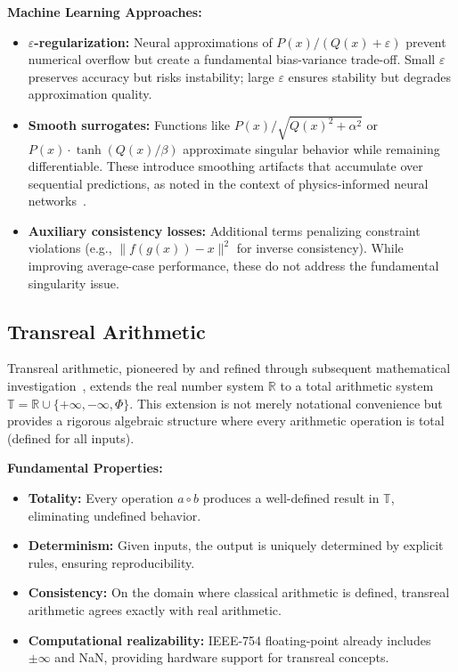 \documentclass[twoside,11pt]{article}
\newcommand{\TR}{\mathbb{T}}
\newcommand{\RR}{\mathbb{R}}
\begin{document}
\textbf{Machine Learning Approaches:}
\begin{itemize}
\item \textbf{$\varepsilon$-regularization:} Neural approximations of $P(x)/(Q(x)+\varepsilon)$ prevent numerical overflow but create a fundamental bias-variance trade-off. Small $\varepsilon$ preserves accuracy but risks instability; large $\varepsilon$ ensures stability but degrades approximation quality.
\item \textbf{Smooth surrogates:} Functions like $P(x)/\sqrt{Q(x)^2 + \alpha^2}$ or $P(x)\cdot\tanh(Q(x)/\beta)$ approximate singular behavior while remaining differentiable. These introduce smoothing artifacts that accumulate over sequential predictions, as noted in the context of physics-informed neural networks~\citep{wang2021understanding}.
\item \textbf{Auxiliary consistency losses:} Additional terms penalizing constraint violations (e.g., $\|f(g(x)) - x\|^2$ for inverse consistency). While improving average-case performance, these do not address the fundamental singularity issue.
\end{itemize}
\subsection{Transreal Arithmetic}
Transreal arithmetic, pioneered by \citet{anderson2006perspex} and refined through subsequent mathematical investigation~\citep{reis2016transreal,reis2016transfields}, extends the real number system $\RR$ to a total arithmetic system $\TR = \RR \cup \{+\infty, -\infty, \Phi\}$. This extension is not merely notational convenience but provides a rigorous algebraic structure where every arithmetic operation is total (defined for all inputs).

\textbf{Fundamental Properties:}
\begin{itemize}
\item \textbf{Totality:} Every operation $a \circ b$ produces a well-defined result in $\TR$, eliminating undefined behavior.
\item \textbf{Determinism:} Given inputs, the output is uniquely determined by explicit rules, ensuring reproducibility.
\item \textbf{Consistency:} On the domain where classical arithmetic is defined, transreal arithmetic agrees exactly with real arithmetic.
\item \textbf{Computational realizability:} IEEE-754 floating-point already includes $\pm\infty$ and NaN, providing hardware support for transreal concepts.
\end{itemize}
\end{document}
